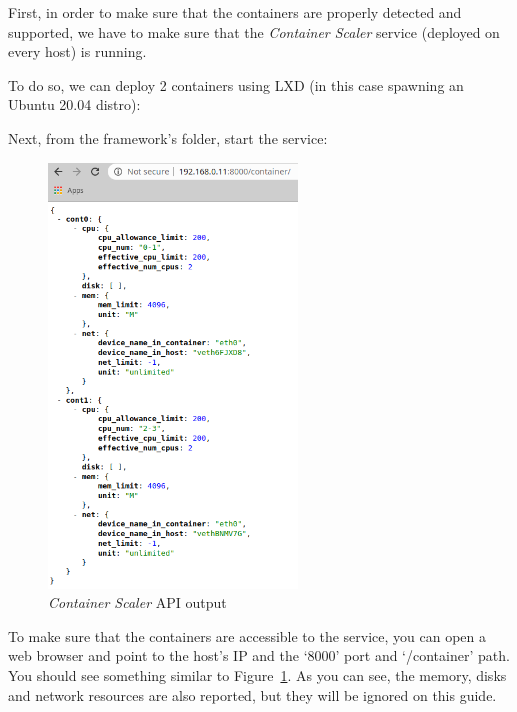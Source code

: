 \documentclass[12pt]{article}
\begin{document}
First, in order to make sure that the containers are properly detected and supported, we have to make sure that the \textit{Container Scaler} service (deployed on every host) is running.

To do so, we can deploy 2 containers using LXD (in this case spawning an Ubuntu 20.04 distro): \newline

\noindent {} \newline
{} \newline
{} \newline

Next, from the framework's folder, start the service: \newline

\noindent {} \newline


\begin{figure}[!tb]
	\centering
	\includegraphics[width=0.59\textwidth]{../img/quickstart/ContainerScaler.png}
	\caption{\textit{Container Scaler} API output}
	\label{fig:ContainerScalerAPI}
\end{figure}

To make sure that the containers are accessible to the service, you can open a web browser and point to the host's IP and the `8000' port and `/container' path. You should see something similar to Figure~\ref{fig:ContainerScalerAPI}. As you can see, the memory, disks and network resources are also reported, but they will be ignored on this guide.
\end{document}
